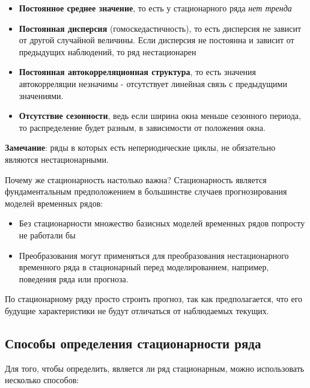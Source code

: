 \documentclass[aps,%
12pt,%
final,%
oneside,
onecolumn,%
musixtex, %
superscriptaddress,%
centertags]{article} %
\theoremstyle{plain}
\theoremstyle{definition}
\theoremstyle{remark}
\begin{document}
\begin{itemize}
	\item \textbf{Постоянное среднее значение}, то есть у стационарного ряда \textit{нет тренда}
	\item \textbf{Постоянная дисперсия} (гомоскедастичность), то есть дисперсия не зависит от другой случайной величины. Если дисперсия не постоянна и зависит от предыдущих наблюдений, то ряд нестационарен 
	\item \textbf{Постоянная автокорреляционная структура}, то есть значения автокорреляции незначимы - отсутствует линейная связь с предыдущими значениями.
	\item \textbf{Отсутствие сезонности}, ведь если ширина окна меньше сезонного периода, то распределение будет разным, в зависимости от положения окна.
\end{itemize}

\textbf{Замечание}: ряды в которых есть непериодические циклы, не обязательно являются нестационарными.

Почему же стационарность настолько важна? Стационарность является фундаментальным предположением в большинстве случаев прогнозирования моделей временных рядов:

\begin{itemize}
	\item Без стационарности множество базисных моделей временных рядов попросту не работали бы
	\item Преобразования могут применяться для преобразования нестационарного временного ряда в стационарный перед моделированием, например, поведения ряда или прогноза.
\end{itemize}

По стационарному ряду просто строить прогноз, так как предполагается, что его будущие характеристики не будут отличаться от наблюдаемых текущих.

\newpage
\subsection{Способы определения стационарности ряда}

Для того, чтобы определить, является ли ряд стационарным, можно использовать несколько способов:
\end{document}
